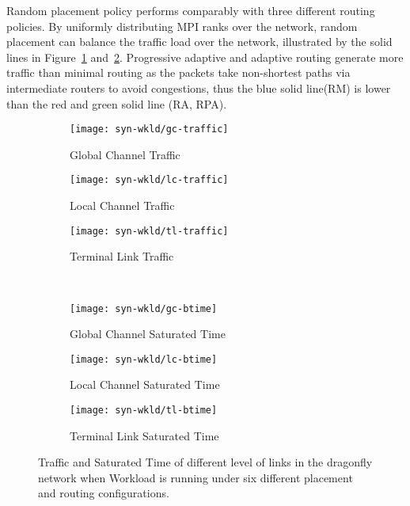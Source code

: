 Random placement policy performs comparably with three different routing policies.
By uniformly distributing MPI ranks over the network, 
random placement can balance the traffic load over the network,
illustrated by the solid lines in Figure~\ref{fig:synwkld-global-channel-traffic} and~\ref{fig:synwkld-local-channel-traffic}. 
Progressive adaptive and adaptive routing generate more traffic than minimal routing
as the packets take non-shortest paths via intermediate routers to avoid congestions, 
thus the blue solid line(RM) is lower than the red and green solid line (RA, RPA).



\begin{figure*}[t]
    \centering
    \begin{subfigure}[t]{0.32\textwidth}
        \centering
        \texttt{[image: syn-wkld/gc-traffic]}
        \caption{Global Channel Traffic}
        \label{fig:synwkld-global-channel-traffic}
    \end{subfigure}\hfill
    \hspace{1em}%
    \begin{subfigure}[t]{0.32\textwidth}
        \centering
        \texttt{[image: syn-wkld/lc-traffic]}
        \caption{Local Channel Traffic}
        \label{fig:synwkld-local-channel-traffic}
    \end{subfigure}\hfill
    \hspace{1em}%
    \begin{subfigure}[t]{0.32\textwidth}
        \centering
        \texttt{[image: syn-wkld/tl-traffic]}
        \caption{Terminal Link Traffic}
        \label{fig:synwkld-terminal-link-traffic}
    \end{subfigure}\\

    \begin{subfigure}[t]{0.32\textwidth}
        \centering
        \texttt{[image: syn-wkld/gc-btime]}
        \caption{Global Channel Saturated Time}
        \label{fig:synwkld-global-channel-stime}
    \end{subfigure}\hfill
     \hspace{1em}%
    \begin{subfigure}[t]{0.32\textwidth}
        \centering
        \texttt{[image: syn-wkld/lc-btime]}
        \caption{Local Channel Saturated Time}
        \label{fig:synwkld-local-channel-stime}
    \end{subfigure}\hfill
    \hspace{1em}%
    \begin{subfigure}[t]{0.32\textwidth}
        \centering
        \texttt{[image: syn-wkld/tl-btime]}
        \caption{Terminal Link Saturated Time}
        \label{fig:synwkld-terminal-link-stime}
    \end{subfigure}%
   \caption{Traffic and Saturated Time of different level of links in the dragonfly network when Workload  is running under six different placement and routing configurations.}
   \label{fig:synwkld-network-traffic-stime}
\end{figure*}



